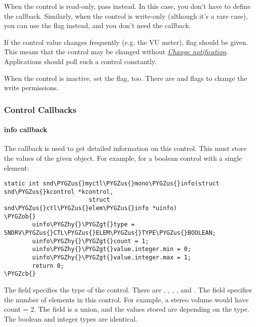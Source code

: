 \documentclass[a4paper,8pt,english]{sphinxmanual}
\def\PYGZus{\char`\_}
\def\PYGZob{\char`\{}
\def\PYGZcb{\char`\}}
\def\PYGZgt{\char`\>}
\def\PYGZhy{\char`\-}
\begin{document}
When the control is read-only, pass 
instead. In this case, you don't have to define the  callback.
Similarly, when the control is write-only (although it's a rare case),
you can use the  flag instead, and you don't need the 
callback.

If the control value changes frequently (e.g. the VU meter),
 flag should be given. This means that the control may be
changed without {\hyperref[sound/kernel\string-api/writing\string-an\string-alsa\string-driver:change\string-notification]{\emph{Change notification}}}. Applications should poll such
a control constantly.

When the control is inactive, set the  flag, too. There are
 and  flags to change the write permissions.


\subsubsection{Control Callbacks}
\label{sound/kernel-api/writing-an-alsa-driver:control-callbacks}

\paragraph{info callback}
\label{sound/kernel-api/writing-an-alsa-driver:info-callback}
The  callback is used to get detailed information on this
control. This must store the values of the given  object. For example,
for a boolean control with a single element:

\begin{Verbatim}[commandchars=\\\{\}]
static int snd\PYGZus{}myctl\PYGZus{}mono\PYGZus{}info(struct snd\PYGZus{}kcontrol *kcontrol,
                        struct snd\PYGZus{}ctl\PYGZus{}elem\PYGZus{}info *uinfo)
\PYGZob{}
        uinfo\PYGZhy{}\PYGZgt{}type = SNDRV\PYGZus{}CTL\PYGZus{}ELEM\PYGZus{}TYPE\PYGZus{}BOOLEAN;
        uinfo\PYGZhy{}\PYGZgt{}count = 1;
        uinfo\PYGZhy{}\PYGZgt{}value.integer.min = 0;
        uinfo\PYGZhy{}\PYGZgt{}value.integer.max = 1;
        return 0;
\PYGZcb{}
\end{Verbatim}

The  field specifies the type of the control. There are
, , , ,  and
. The  field specifies the number of elements in
this control. For example, a stereo volume would have count = 2. The
 field is a union, and the values stored are depending on the
type. The boolean and integer types are identical.
\end{document}
